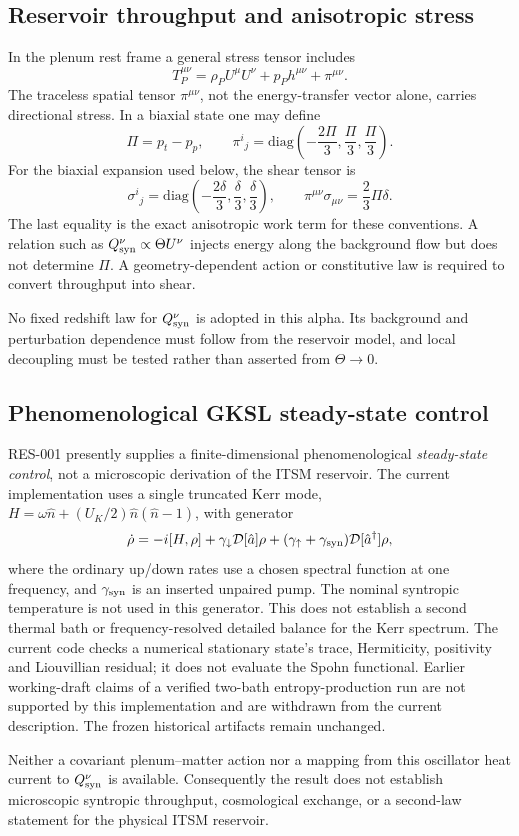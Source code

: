 \subsection{Reservoir throughput and anisotropic stress}

In the plenum rest frame a general stress tensor includes
\begin{equation}
 T_P^{\mu\nu}=\rho_P U^\mu U^\nu+p_Ph^{\mu\nu}+\pi^{\mu\nu}.
 \label{eq:plenum-stress}
\end{equation}
The traceless spatial tensor $\pi^{\mu\nu}$, not the energy-transfer vector
alone, carries directional stress.  In a biaxial state one may define
\begin{equation}
 \Pi=p_t-p_p,
 \qquad
 \pi^i{}_j=\mathrm{diag}\left(-\frac{2\Pi}{3},\frac{\Pi}{3},\frac{\Pi}{3}\right).
 \label{eq:biaxial-pi}
\end{equation}
For the biaxial expansion used below, the shear tensor is
\begin{equation}
 \sigma^i{}_j=\mathrm{diag}\left(-\frac{2\delta}{3},
 \frac{\delta}{3},\frac{\delta}{3}\right),
 \qquad
 \pi^{\mu\nu}\sigma_{\mu\nu}=\frac{2}{3}\Pi\delta.
 \label{eq:anisotropic-work}
\end{equation}
The last equality is the exact anisotropic work term for these conventions.
A relation such as $Q_{\rm syn}^{\nu}\propto\Theta U^\nu$ injects energy along
the background flow but does not determine $\Pi$.  A geometry-dependent
action or constitutive law is required to convert throughput into shear.

No fixed redshift law for $Q_{\rm syn}^{\nu}$ is adopted in this alpha.  Its
background and perturbation dependence must follow from the reservoir model,
and local decoupling must be tested rather than asserted from $\Theta\to0$.

\subsection{Phenomenological GKSL steady-state control}

RES-001 presently supplies a finite-dimensional phenomenological
\emph{steady-state control}, not a microscopic derivation of the ITSM
reservoir.  The current implementation uses a single truncated Kerr mode,
$H=\omega\hat n+(U_K/2)\hat n(\hat n-1)$, with generator
\begin{equation}
 \dot\rho=-i[H,\rho]+\gamma_\downarrow\mathcal D[\hat a]\rho
 +(\gamma_\uparrow+\gamma_{\rm syn})
 \mathcal D[\hat a^\dagger]\rho,
 \label{eq:lindblad-master}
\end{equation}
where the ordinary up/down rates use a chosen spectral function at one
frequency, and $\gamma_{\rm syn}$ is an inserted unpaired pump.  The nominal
syntropic temperature is not used in this generator.  This does not establish
a second thermal bath or frequency-resolved detailed balance for the Kerr
spectrum.  The current code checks a numerical stationary state's trace,
Hermiticity, positivity and Liouvillian residual; it does not evaluate the
Spohn functional.  Earlier working-draft claims of a verified two-bath
entropy-production run are not supported by this implementation and are
withdrawn from the current description.  The frozen historical artifacts
remain unchanged.

Neither a covariant plenum--matter action nor a mapping from this oscillator
heat current to $Q_{\rm syn}^{\nu}$ is available.  Consequently the result
does not establish microscopic syntropic throughput, cosmological exchange, or
a second-law statement for the physical ITSM reservoir.
